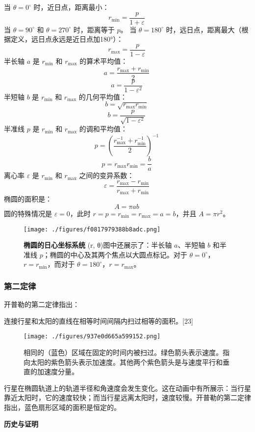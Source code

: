 当 \( \theta = 0^\circ \) 时，近日点，距离最小：
\[
r_{\min} = \frac{p}{1 + \varepsilon}~
\]
当 \( \theta = 90^\circ \) 和 \( \theta = 270^\circ \) 时，距离等于 \( p \)。
当 \( \theta = 180^\circ \) 时，远日点，距离最大（根据定义，远日点永远是近日点加180°）：
\[
r_{\max} = \frac{p}{1 - \varepsilon}~
\]
半长轴 \( a \) 是 \( r_{\min} \) 和 \( r_{\max} \) 的算术平均值：
\[
a = \frac{r_{\max} + r_{\min}}{2}~
\]
\[
a = \frac{p}{1 - \varepsilon^2}~
\]
半短轴 \( b \) 是 \( r_{\min} \) 和 \( r_{\max} \) 的几何平均值：
\[
b = \sqrt{r_{\max} r_{\min}}~
\]
\[
b = \frac{p}{\sqrt{1 - \varepsilon^2}}~
\]
半准线 \( p \) 是 \( r_{\min} \) 和 \( r_{\max} \) 的调和平均值：
\[
p = \left( \frac{r_{\max}^{-1} + r_{\min}^{-1}}{2} \right)^{-1}~
\]
\[p = r_{\max} r_{\min} = \frac{b}{a}~\]
离心率 \( \varepsilon \) 是 \( r_{\min} \) 和 \( r_{\max} \) 之间的变异系数：
\[
\varepsilon = \frac{r_{\max} - r_{\min}}{r_{\max} + r_{\min}}~
\]
椭圆的面积是：
\[
A = \pi ab~
\]
圆的特殊情况是 \( \varepsilon = 0 \)，此时 \( r = p = r_{\min} = r_{\max} = a = b \)，并且 \( A = \pi r^2 \)。
\begin{figure}[ht]
\centering
\texttt{[image: ./figures/f0817979388b8adc.png]}
\caption{\textbf{椭圆的日心坐标系统} (r, θ)图中还展示了：半长轴 \(a\)、半短轴 \(b\) 和半准线 \(p\)；椭圆的中心及其两个焦点以大圆点标记。对于 \( \theta = 0^\circ \)，\( r = r_{\min} \)，而对于 \( \theta = 180^\circ \)，\( r = r_{\max} \)。} \label{fig_KPL_3}
\end{figure}
\subsubsection{第二定律}  
开普勒的第二定律指出：

连接行星和太阳的直线在相等时间间隔内扫过相等的面积。[23]
\begin{figure}[ht]
\centering
\texttt{[image: ./figures/937e0d665a599152.png]}
\caption{相同的（蓝色）区域在固定的时间内被扫过。绿色箭头表示速度。指向太阳的紫色箭头表示加速度。其他两个紫色箭头是与速度平行和垂直的加速度分量。} \label{fig_KPL_4}
\end{figure}
行星在椭圆轨道上的轨道半径和角速度会发生变化。这在动画中有所展示：当行星靠近太阳时，它的速度较快；而当行星远离太阳时，速度较慢。开普勒的第二定律指出，蓝色扇形区域的面积是恒定的。

\textbf{历史与证明}

